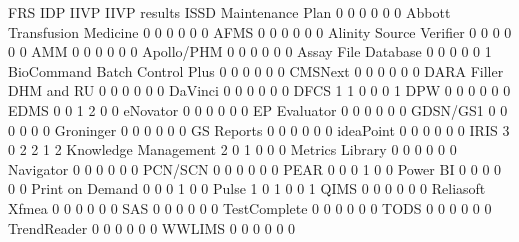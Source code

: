 \documentclass{article}
\begin{document}
\begin{Schunk}
\begin{Soutput}
                                FRS IDP IIVP IIVP results ISSD Maintenance Plan
                                  0   0    0            0    0                0
  Abbott Transfusion Medicine     0   0    0            0    0                0
  AFMS                            0   0    0            0    0                0
  Alinity Source Verifier         0   0    0            0    0                0
  AMM                             0   0    0            0    0                0
  Apollo/PHM                      0   0    0            0    0                0
  Assay File Database             0   0    0            0    0                1
  BioCommand Batch Control Plus   0   0    0            0    0                0
  CMSNext                         0   0    0            0    0                0
  DARA Filler DHM and RU          0   0    0            0    0                0
  DaVinci                         0   0    0            0    0                0
  DFCS                            1   1    0            0    0                1
  DPW                             0   0    0            0    0                0
  EDMS                            0   0    1            2    0                0
  eNovator                        0   0    0            0    0                0
  EP Evaluator                    0   0    0            0    0                0
  GDSN/GS1                        0   0    0            0    0                0
  Groninger                       0   0    0            0    0                0
  GS Reports                      0   0    0            0    0                0
  ideaPoint                       0   0    0            0    0                0
  IRIS                            3   0    2            2    1                2
  Knowledge Management            2   0    1            0    0                0
  Metrics Library                 0   0    0            0    0                0
  Navigator                       0   0    0            0    0                0
  PCN/SCN                         0   0    0            0    0                0
  PEAR                            0   0    0            1    0                0
  Power BI                        0   0    0            0    0                0
  Print on Demand                 0   0    0            1    0                0
  Pulse                           1   0    1            0    0                1
  QIMS                            0   0    0            0    0                0
  Reliasoft Xfmea                 0   0    0            0    0                0
  SAS                             0   0    0            0    0                0
  TestComplete                    0   0    0            0    0                0
  TODS                            0   0    0            0    0                0
  TrendReader                     0   0    0            0    0                0
  WWLIMS                          0   0    0            0    0                0
                               

\end{Soutput}
\end{Schunk}
\end{document}
